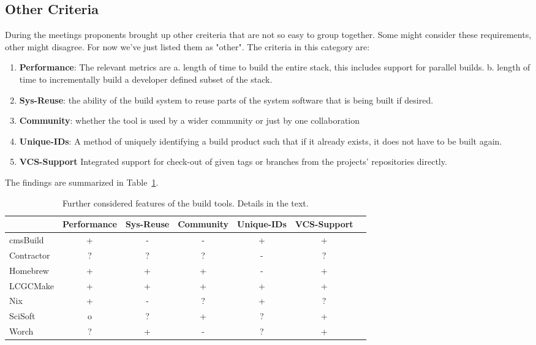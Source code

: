 \documentclass[12pt,a4paper]{article}
\begin{document}
\subsection{Other Criteria}
During the meetings proponents brought up other creiteria that are not so easy to group together.  Some might consider these requirements, other might disagree. For now we've just listed them as "other". The criteria in this category are:
\begin{enumerate}
\item \textbf{Performance}: The relevant metrics are a. length of time to build the entire stack, this includes support for parallel builds. b. length of time to incrementally build a developer defined subset of the stack. 
\item \textbf{Sys-Reuse}: the ability of the build system to reuse parts of the system software that is being built if desired.
\item \textbf{Community}: whether the tool is used by a wider community or just by one collaboration 
\item \textbf{Unique-IDs}: A method of uniquely identifying a build product such that if it already exists, it does not have to be built again. 
  \item \textbf{VCS-Support} Integrated support for check-out of given tags or branches from the projects’ repositories directly.
\end{enumerate}
The findings are summarized in Table~\ref{tab:taxonomyOthers}. 
\begin{table}
\centering
\begin{tabular}{lcccccc}

&Performance & Sys-Reuse & Community & Unique-IDs & VCS-Support\\ \hline
cmsBuild & \cellcolor{green} + & \cellcolor{red} - & \cellcolor{red} - & \cellcolor{green} +& \cellcolor{green} +  \\
Contractor & ? & ?  & ? & \cellcolor{red} - & ?\\
Homebrew & \cellcolor{green} +  & \cellcolor{green} +  & \cellcolor{green} + & \cellcolor{red} - & \cellcolor{green} + \\
LCGCMake & \cellcolor{green} + & \cellcolor{green} + & \cellcolor{green} + & \cellcolor{green} + & \cellcolor{green} + \\
Nix & \cellcolor{green} + & \cellcolor{red} -  & ? & \cellcolor{green} + & ? \\
SciSoft & \cellcolor{yellow} o & ? & \cellcolor{green} + & ? & \cellcolor{green}+  \\
Worch &  ? &  \cellcolor{green} + & \cellcolor{red} -  & ? & \cellcolor{green} + 
\end{tabular}
\caption{\label{tab:taxonomyOthers}Further considered features of the build tools. Details in the text.}
\end{table}
\end{document}
